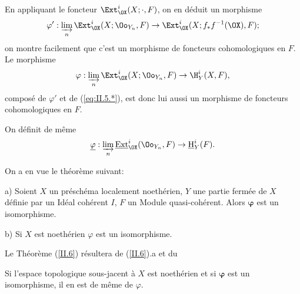 En appliquant le foncteur $\Ext_{\OX}^i(X;\cdot, F)$, on en d\'eduit un morphisme
$$
\varphi': \varinjlim_{n} \Ext_{\OX}^i(X;\Oo_{Y_n}, F) \to \Ext_{\OX}^i(X;f_{*}f^{-1}(\OX), F);
$$
on montre facilement que c'est un morphisme de foncteurs cohomologiques en $F$. Le morphisme
$$
\varphi: \varinjlim_{n} \Ext_{\OX}^i(X;\Oo_{Y_n}, F) \to \H_Y^i(X, F),
$$
compos\'e de $\varphi'$ et de (\ref{eq:II.5.*}), est donc lui aussi un morphisme de foncteurs cohomologiques en $F$.

\enlargethispage{\baselineskip}%
On d\'efinit de m\^eme
$$
\underline{\varphi}: \varinjlim_{n} \mathop{\underline{\mathrm{Ext}}}\nolimits_{\OX}^i(\Oo_{Y_n}, F) \to {\mathop{\underline{\mathrm{H}}}\nolimits}_Y^i(F).
$$

On a en vue le th\'eor\`eme suivant:

\begin{suptheoreme} \label{II.6} \textup{a)}
Soient $X$ un pr\'esch\'ema localement noeth\'erien, $Y$ une partie ferm\'ee de $X$ d\'efinie par un Id\'eal coh\'erent $I$, $F$ un Module quasi-coh\'erent. Alors $\boldsymbol{\varphi}$ est un isomorphisme.

\textup{b)} Si $X$ est noeth\'erien $\varphi$ est un isomorphisme.
\end{suptheoreme}

Le Th\'eor\`eme (\ref{II.6}) r\'esultera de (\ref{II.6}).a et du

\begin{suplemme} \label{II.7} Si l'espace topologique sous-jacent \`a $X$ est noeth\'erien et si $\boldsymbol{\varphi}$ est un isomorphisme, il en est de m\^eme de $\varphi$.
\end{suplemme}

